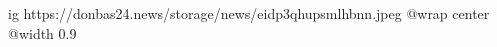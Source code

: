  
 
 
 
 

\ifcmt
  ig https://donbas24.news/storage/news/eidp3qhupsmlhbnn.jpeg
  @wrap center
  @width 0.9
\fi
